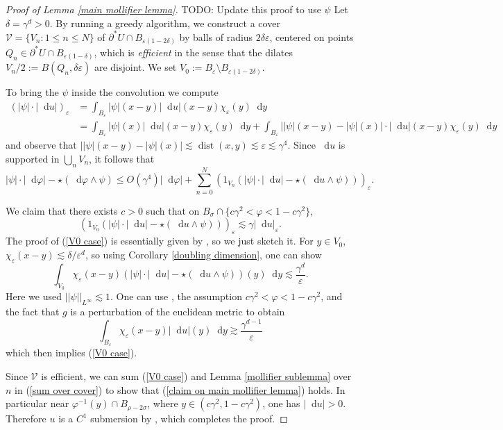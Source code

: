 \documentclass[reqno,10pt]{amsart}
\newcommand*\dif{\mathop{}\!\mathrm{d}}
\DeclareMathOperator{\dist}{dist}
\newcommand{\dfn}[1]{\emph{#1}\index{#1}}
\theoremstyle{definition}
\numberwithin{equation}{section}
\begin{document}
\begin{proof}[Proof of Lemma \ref{main mollifier lemma}]
TODO: Update this proof to use $\psi$
Let $\delta = \gamma^d > 0$.
By running a greedy algorithm, we construct a cover $\mathcal V = \{V_n: 1 \leq n \leq N\}$ of $\partial^* U \cap B_{\varepsilon(1 - 2\delta)}$ by balls of radius $2\delta\varepsilon$, centered on points $Q_n \in \partial^* U \cap B_{\varepsilon(1 - \delta)}$, which is \dfn{efficient} in the sense that the dilates $V_n/2 := B(Q_n, \delta\varepsilon)$ are disjoint.
We set $V_0 := B_\varepsilon \setminus B_{\varepsilon(1 - 2\delta)}$.

To bring the $\psi$ inside the convolution we compute
\begin{align*}
(|\psi| \cdot |\dif u|)_\varepsilon
&= \int_{B_\varepsilon} |\psi|(x - y) |\dif u|(x - y) \chi_\varepsilon(y) \dif y \\
&= \int_{B_\varepsilon} |\psi|(x) |\dif u|(x - y) \chi_\varepsilon(y) \dif y + \int_{B_\varepsilon} ||\psi|(x - y) - |\psi|(x)| \cdot |\dif u|(x - y) \chi_\varepsilon(y) \dif y
\end{align*}
and observe that $||\psi|(x - y) - |\psi|(x)| \lesssim \dist(x, y) \lesssim \varepsilon \lesssim \gamma^4$.
Since $\dif u$ is supported in $\bigcup_n V_n$, it follows that
\begin{equation}\label{sum over cover}
|\psi| \cdot |\dif \varphi| - \star(\dif \varphi \wedge \psi)
\leq O(\gamma^4) |\dif \varphi| + \sum_{n=0}^N (1_{V_n}(|\psi| \cdot |\dif u| - \star(\dif u \wedge \psi)))_\varepsilon.
\end{equation}

We claim that there exists $c > 0$ such that on $B_\sigma \cap \{c\gamma^2 < \varphi < 1 - c\gamma^2\}$,
\begin{equation}\label{V0 case}
(1_{V_0}(|\psi| \cdot |\dif u| - \star(\dif u \wedge \psi)))_\varepsilon \lesssim \gamma |\dif u|_\varepsilon.
\end{equation}
The proof of (\ref{V0 case}) is essentially given by \cite[pg92]{Giusti77}, so we just sketch it.
For $y \in V_0$, $\chi_\varepsilon(x - y) \lesssim \delta/\varepsilon^d$, so using Corollary \ref{doubling dimension}, one can show
$$\int_{V_0} \chi_\varepsilon(x - y)(|\psi| \cdot |\dif u| - \star(\dif u \wedge \psi))(y) \dif y \lesssim \frac{\gamma^d}{\varepsilon}.$$
Here we used $||\psi||_{L^\infty} \lesssim 1$.
One can use \cite[Lemma 7.1]{Giusti77}, the assumption $c\gamma^2 < \varphi < 1 - c\gamma^2$, and the fact that $g$ is a perturbation of the euclidean metric to obtain
$$\int_{B_\varepsilon} \chi_\varepsilon(x - y) |\dif u|(y) \dif y \gtrsim \frac{\gamma^{d - 1}}{\varepsilon}$$
which then implies (\ref{V0 case}).

Since $\mathcal V$ is efficient, we can sum (\ref{V0 case}) and Lemma \ref{mollifier sublemma} over $n$ in (\ref{sum over cover}) to show that (\ref{claim on main mollifier lemma}) holds.
In particular near $\varphi^{-1}(y) \cap B_{\rho - 2\sigma}$, where $y \in (c\gamma^2, 1 - c\gamma^2)$, one has $|\dif u| > 0$.
Therefore $u$ is a $C^1$ submersion by \cite[Lemma 7.1]{Giusti77}, which completes the proof.
\end{proof}
\end{document}
